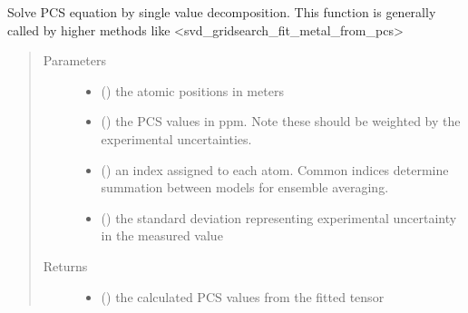 \documentclass[a4paper,10pt,english,openany,oneside]{sphinxmanual}
\begin{document}
\begin{fulllineitems}
\label{\detokenize{reference/generated/paramagpy.fit.svd_calc_metal_from_pcs:paramagpy.fit.svd_calc_metal_from_pcs}}
\sphinxAtStartPar
Solve PCS equation by single value decomposition.
This function is generally called by higher methods like
\textless{}svd\_gridsearch\_fit\_metal\_from\_pcs\textgreater{}
\begin{quote}\begin{description}
\item[{Parameters}] \leavevmode\begin{itemize}
\item {} 
\sphinxAtStartPar
{} (\sphinxstyleliteralemphasis{\sphinxupquote{ {[}}}\sphinxstyleliteralemphasis{\sphinxupquote{,}}\sphinxstyleliteralemphasis{\sphinxupquote{,}}\sphinxstyleliteralemphasis{\sphinxupquote{{]} }}) \textendash{} the atomic positions in meters

\item {} 
\sphinxAtStartPar
{} () \textendash{} the PCS values in ppm. Note these should be weighted by the
experimental uncertainties.

\item {} 
\sphinxAtStartPar
{} () \textendash{} an index assigned to each atom. Common indices determine summation
between models for ensemble averaging.

\item {} 
\sphinxAtStartPar
{} () \textendash{} the standard deviation representing experimental uncertainty
in the measured value

\end{itemize}

\item[{Returns}] \leavevmode
\sphinxAtStartPar
\begin{itemize}
\item {} 
\sphinxAtStartPar
{} () \textendash{} the calculated PCS values from the fitted tensor


\end{itemize}
\end{description}
\end{quote}
\end{fulllineitems}
\end{document}

